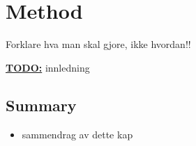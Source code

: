 \chapter{Method}
\label{chapter:method}
Forklare hva man skal gjore, ikke hvordan!!

\textbf{\underline{\LARGE TODO:}} innledning







\section{Summary}
\label{sect:method:summary}
\begin{itemize}
  \item sammendrag av dette kap
\end{itemize}